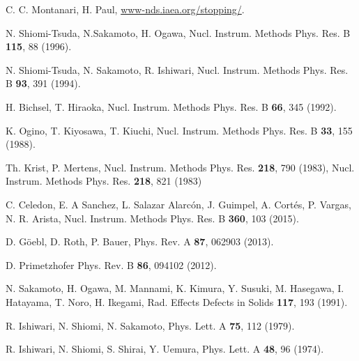 \begin{thebibliography}{9}
C. C. Montanari, H. Paul,
\href{https://www-nds.iaea.org/stopping/}{www-nds.iaea.org/stopping/}.

N. Shiomi-Tsuda, N.Sakamoto, H. Ogawa, 
Nucl. Instrum. Methods Phys. Res. B \textbf{115}, 88 (1996).

N. Shiomi-Tsuda, N. Sakamoto, R. Ishiwari, 
Nucl. Instrum. Methods Phys. Res. B \textbf{93}, 391 (1994).

H. Bichsel, T. Hiraoka, 
Nucl. Instrum. Methods Phys. Res. B \textbf{66}, 345 (1992).

K. Ogino, T. Kiyosawa, T. Kiuchi, 
Nucl. Instrum. Methods Phys. Res. B \textbf{33}, 155 (1988).

Th. Krist, P. Mertens,
Nucl. Instrum. Methods Phys. Res. \textbf{218}, 790 (1983),
Nucl. Instrum. Methods Phys. Res. \textbf{218}, 821 (1983)

C. Celedon, E. A Sanchez, L. Salazar Alarcón, J. Guimpel, A. Cortés,
P. Vargas, N. R. Arista,
Nucl. Instrum. Methods Phys. Res. B \textbf{360}, 103 (2015).

D. G\"oebl, D. Roth, P. Bauer, 
Phys. Rev. A \textbf{87}, 062903 (2013).

D. Primetzhofer
Phys. Rev. B \textbf{86}, 094102 (2012).

N. Sakamoto, H. Ogawa, M. Mannami, K. Kimura, Y. Susuki, M. Hasegawa,
I. Hatayama, T. Noro, H. Ikegami, 
Rad. Effects Defects in Solids \textbf{117}, 193 (1991).

R. Ishiwari, N. Shiomi, N. Sakamoto, 
Phys. Lett. A \textbf{75}, 112 (1979).

R. Ishiwari, N. Shiomi, S. Shirai, Y. Uemura, 
Phys. Lett. A \textbf{48}, 96 (1974).


\begin{comment}

\bibitem{Montanari:11}
C.C. Montanari, D. M. Mitnik, J. E. Miraglia,
Rad. Eff. Defects Sol. \textbf{166}, 338 (2011).

\bibitem{Oswald:18}
M. Oswal, Sunil Kumar, Udai Singh, G. Singhe, K. P. Singh, D. Mehta,
D. Mitnik, C. C. Montanari, T.Nandi,
Nucl. Instrum. Methods Phys. Res., B \textbf{416}, 110 (2018).

\bibitem{Abril} 
I. Abril, M. Behar, R. Garcia Molina, R. C. Fadanelli, L. C. C. M. Nagamine, 
P. L. Grande, L. Sch\"unemann, C. D. Denton, N. R. Arista, E. B. Saitovich,
Eur. Phys. J. D \text{54}, 65-70 (2009).


\end{comment}
\end{thebibliography}
